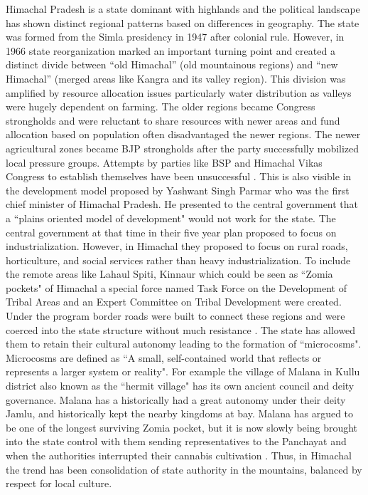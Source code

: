 \begin{sloppypar}

 Himachal Pradesh is a state dominant with highlands and the political landscape has shown distinct regional patterns based on differences in geography. The state was formed from the Simla presidency in 1947 after colonial rule. However, in 1966 state reorganization marked an important turning point and created a distinct divide between \enquote{old Himachal} (old mountainous regions) and \enquote{new Himachal} (merged areas like Kangra and its valley region)\citep{TR_Sharma_1987}. This division was amplified by resource allocation issues particularly water distribution as valleys were hugely dependent on farming. The older regions became Congress strongholds and were reluctant to share resources with newer areas and fund allocation based on population often disadvantaged the newer regions. The newer agricultural zones became BJP strongholds after the party successfully mobilized local pressure groups. Attempts by parties like BSP and Himachal Vikas Congress to establish themselves have been unsuccessful \citep{chauhan2004bipolar}. This is also visible in the development model proposed by Yashwant Singh Parmar who was the first chief minister of Himachal Pradesh. He presented to the central government that a ``plains oriented model of development" would not work for the state. The  central government at that time in their five year plan proposed to  focus on industrialization. However, in Himachal they proposed to focus on rural roads, horticulture, and social services rather than heavy industrialization. To include the remote areas like Lahaul Spiti, Kinnaur which could be seen as ``Zomia pockets" of Himachal a special force named Task Force on the Development of Tribal Areas and an Expert Committee on Tribal Development were created. Under the program border roads were built to connect these regions and were coerced into the state structure without much resistance \citep{StateEffectiveness2020}. The state has allowed them to retain their cultural autonomy leading to the formation of ``microcosms". Microcosms are defined as ``A small, self\hyp{}contained world that reflects or represents a larger system or reality". For example the village of Malana in Kullu district also known as the ``hermit village" has its own ancient council and deity governance. Malana has a historically had a great autonomy under their deity Jamlu, and historically  kept the nearby kingdoms at bay. Malana has argued to be one of the longest surviving Zomia pocket, but it is now slowly being brought into the state control with them sending representatives to the Panchayat and when the authorities interrupted their cannabis cultivation \citep{axelby2015hermit}. Thus, in Himachal the trend has been consolidation of state authority in the mountains, balanced by respect for local culture.

\end{sloppypar}
